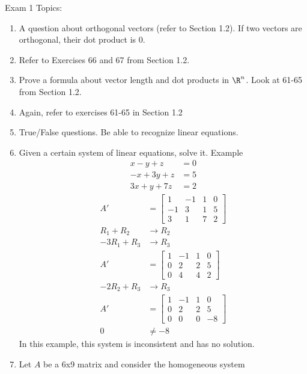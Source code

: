 \documentclass{math}
\begin{document}
\noindent Exam 1 Topics:
\begin{enumerate}
  \item A question about orthogonal vectors (refer to Section 1.2). If two
    vectors are orthogonal, their dot product is 0.
  \item Refer to Exercises 66 and 67 from Section 1.2.
  \item Prove a formula about vector length and dot products in \( \R^n \).
    Look at 61-65 from Section 1.2.
  \item Again, refer to exercises 61-65 in Section 1.2
  \item True/False questions. Be able to recognize linear equations.
  \item Given a certain system of linear equations, solve it. Example
    \begin{align*}
      x-y+z &= 0 \\
      -x+3y+z &= 5 \\
      3x+y+7z &= 2
    \end{align*}
    \begin{align*}
      A' &= \left[\begin{array}{ccc|c}
        1 & -1 & 1 & 0 \\
        -1 & 3 & 1 & 5 \\
        3 & 1 & 7 & 2
      \end{array}\right] \\
      R_1+R_2 &\to R_2 \\
      -3R_1+R_3 &\to R_3 \\
      A' &= \left[\begin{array}{ccc|c}
        1 & -1 & 1 & 0 \\
        0 & 2 & 2 & 5 \\
        0 & 4 & 4 & 2
      \end{array}\right] \\
      -2R_2+R_3 &\to R_3 \\
      A' &= \left[\begin{array}{ccc|c}
        1 & -1 & 1 & 0 \\
        0 & 2 & 2 & 5 \\
        0 & 0 & 0 & -8
      \end{array}\right] \\
      0 &\ne -8
    \end{align*}
    In this example, this system is inconsistent and has no solution.
  \item Let \( A \) be a 6x9 matrix and consider the homogeneous system

\end{enumerate}
\end{document}
